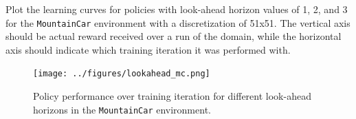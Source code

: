 \documentclass{article}
\begin{document}
\begin{enumerate}[(a)]
Plot the learning curves for policies with look-ahead horizon values of 1, 2, and 3 for the \texttt{MountainCar} environment with a discretization of 51x51. The vertical axis should be actual reward received over a run of the domain, while the horizontal axis should indicate which training iteration it was performed with.

\end{enumerate}

\begin{figure}[h!]
    \centering
        \texttt{[image: ../figures/lookahead\_mc.png]}
        \caption{Policy performance over training iteration for different look-ahead horizons in the \texttt{MountainCar} environment.}
\end{figure}
\end{document}
